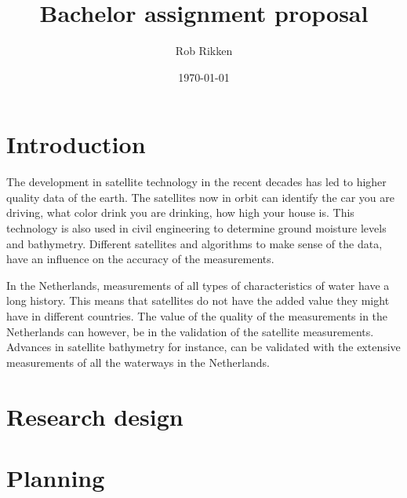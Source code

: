 \documentclass{article}
\title{\textbf{Bachelor assignment proposal}}
\author{Rob Rikken}
\date{\today}
\begin{document}
\maketitle
\newpage
\tableofcontents
\newpage
\listoffigures
 \newpage
\listoftables
\newpage

\section{Introduction}
The development in satellite technology in the recent decades has led to higher quality data of the earth. 
The satellites now in orbit can identify the car you are driving, what color drink you are drinking, how high your house is. 
This technology is also used in civil engineering to determine ground moisture levels\cite{Karthikeyan2017FourComparisons} and bathymetry\cite{Paloscia2013SoilValidation}. 
Different satellites and algorithms to make sense of the data, have an influence on the accuracy of the measurements.

In the Netherlands, measurements of all types of characteristics of water have a long history. 
This means that satellites do not have the added value they might have in different countries. 
The value of the quality of the measurements in the Netherlands can however, be in the validation of the satellite measurements.
Advances in satellite bathymetry for instance, can be validated with the extensive measurements of all the waterways in the Netherlands.



\section{Research design}
\section{Planning}


\end{document}
